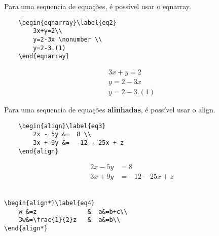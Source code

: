 \begin{frame}[fragile]
    Para uma sequencia de equações, é possível usar o {\code eqnarray}.

\vspace{0.5cm}
\begin{CenteredBox}
\begin{lstlisting}
    \begin{eqnarray}\label{eq2}
        3x+y=2\\
        y=2-3x \nonumber \\
        y=2-3.(1)
    \end{eqnarray}\end{lstlisting}
\end{CenteredBox}

    \begin{eqnarray}\label{eq2}
        3x+y=2\\
        y=2-3x \nonumber \\
        y=2-3.(1)
    \end{eqnarray}
\end{frame}

\begin{frame}[fragile]
    Para uma sequencia de equações \textbf{alinhadas}, é possível usar o {\code align}.

\vspace{0.5cm}
\begin{CenteredBox}
\begin{lstlisting}
    \begin{align}\label{eq3}
        2x - 5y &=  8 \\ 
        3x + 9y &=  -12 - 25x + z
    \end{align}
\end{lstlisting}
\end{CenteredBox}

    \begin{align}\label{eq3}
        2x - 5y &=  8 \\ 
        3x + 9y &=  -12 - 25x + z
    \end{align}
\hrulefill\\

\vspace{0.5cm}
\begin{CenteredBox}
\begin{lstlisting}[linewidth=6.5cm]
\begin{align*}\label{eq4}
    w &=z              &  a&=b+c\\
    3w&=\frac{1}{2}z   &  a&=b\\
\end{align*}
\end{lstlisting}
\end{CenteredBox}


\end{frame}


